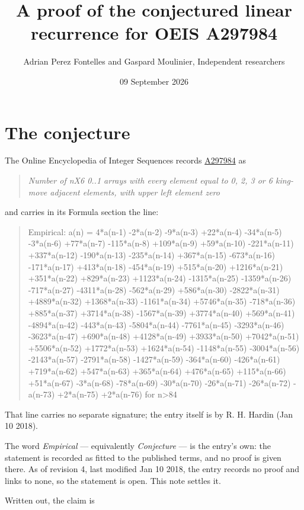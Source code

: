 \documentclass[11pt]{article}
\title{A proof of the conjectured linear recurrence for OEIS A297984}
\author{Adrian Perez Fontelles and Gaspard Moulinier, Independent researchers}
\date{09 September 2026}
\theoremstyle{definition}
\begin{document}
\maketitle
\section{The conjecture}

The Online Encyclopedia of Integer Sequences records \href{https://oeis.org/A297984}{A297984} as

\begin{quote}\itshape Number of nX6 0..1 arrays with every element equal to 0, 2, 3 or 6 king-move adjacent elements, with upper left element zero\end{quote}

and carries in its Formula section the line:

\begin{quote}\ttfamily Empirical: a(n) = 4*a(n-1) -2*a(n-2) -9*a(n-3) +22*a(n-4) -34*a(n-5) -3*a(n-6) +77*a(n-7) -115*a(n-8) +109*a(n-9) +59*a(n-10) -221*a(n-11) +337*a(n-12) -190*a(n-13) -235*a(n-14) +367*a(n-15) -673*a(n-16) -171*a(n-17) +413*a(n-18) -454*a(n-19) +515*a(n-20) +1216*a(n-21) +351*a(n-22) +829*a(n-23) +1123*a(n-24) -1315*a(n-25) -1359*a(n-26) -717*a(n-27) -4311*a(n-28) -562*a(n-29) +586*a(n-30) -2822*a(n-31) +4889*a(n-32) +1368*a(n-33) -1161*a(n-34) +5746*a(n-35) -718*a(n-36) +885*a(n-37) +3714*a(n-38) -1567*a(n-39) +3774*a(n-40) +569*a(n-41) -4894*a(n-42) -443*a(n-43) -5804*a(n-44) -7761*a(n-45) -3293*a(n-46) -3623*a(n-47) +690*a(n-48) +4128*a(n-49) +3933*a(n-50) +7042*a(n-51) +5506*a(n-52) +1772*a(n-53) +1624*a(n-54) -1148*a(n-55) -3004*a(n-56) -2143*a(n-57) -2791*a(n-58) -1427*a(n-59) -364*a(n-60) -426*a(n-61) +719*a(n-62) +547*a(n-63) +365*a(n-64) +476*a(n-65) +115*a(n-66) +51*a(n-67) -3*a(n-68) -78*a(n-69) -30*a(n-70) -26*a(n-71) -26*a(n-72) -a(n-73) +2*a(n-75) +2*a(n-76) for n>84\end{quote}

That line carries no separate signature; the entry itself is by R. H. Hardin (Jan 10 2018).

The word {\itshape Empirical} --- equivalently {\itshape Conjecture} --- is the entry's own: the statement is recorded as fitted to the published terms, and no proof is given there. As of revision 4, last modified Jan 10 2018, the entry records no proof and links to none, so the statement is open. This note settles it.

Written out, the claim is
\end{document}
